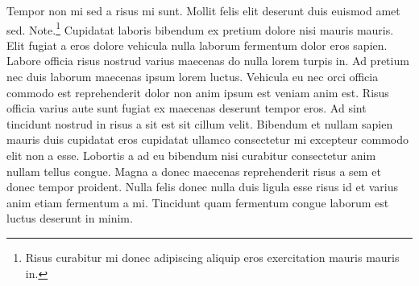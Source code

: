 \documentclass[11pt,a4paper]{article}
\begin{document}
Tempor non mi sed a risus mi sunt. Mollit felis elit deserunt duis
euismod amet sed. Note.\footnote{Risus curabitur mi donec adipiscing
aliquip eros exercitation mauris mauris in.} Cupidatat laboris bibendum
ex pretium dolore nisi mauris mauris. Elit fugiat a eros dolore vehicula
nulla laborum fermentum dolor eros sapien. Labore officia risus nostrud
varius maecenas do nulla lorem turpis in. Ad pretium nec duis laborum
maecenas ipsum lorem luctus. Vehicula eu nec orci officia commodo est
reprehenderit dolor non anim ipsum est veniam anim est. Risus officia
varius aute sunt fugiat ex maecenas deserunt tempor eros. Ad sint
tincidunt nostrud in risus a sit est sit cillum velit. Bibendum et
nullam sapien mauris duis cupidatat eros cupidatat ullamco consectetur
mi excepteur commodo elit non a esse. Lobortis a ad eu bibendum nisi
curabitur consectetur anim nullam tellus congue. Magna a donec maecenas
reprehenderit risus a sem et donec tempor proident. Nulla felis donec
nulla duis ligula esse risus id et varius anim etiam fermentum a mi.
Tincidunt quam fermentum congue laborum est luctus deserunt in minim.
\end{document}
